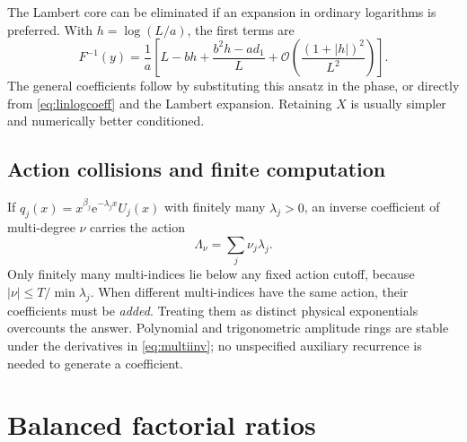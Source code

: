 \documentclass[11pt,a4paper]{article}
\theoremstyle{definition}
\theoremstyle{remark}
\newcommand{\ee}{\mathrm e}
\newcommand{\OO}{\mathcal O}
\numberwithin{equation}{section}
\begin{document}
The Lambert core can be eliminated if an expansion in ordinary logarithms is preferred. With $h=\log(L/a)$, the first terms are
\begin{equation}
 F^{-1}(y)=\frac1a\left[
 L-bh+\frac{b^2h-ad_1}{L}
 +\OO\!\left(\frac{(1+|h|)^2}{L^2}\right)\right].
 \label{eq:flatten}
\end{equation}
The general coefficients follow by substituting this ansatz in the phase, or directly from \eqref{eq:linlogcoeff} and the Lambert expansion. Retaining $X$ is usually simpler and numerically better conditioned.

\subsection{Action collisions and finite computation}
If $q_j(x)=x^{\beta_j}\ee^{-\lambda_jx}U_j(x)$ with finitely many $\lambda_j>0$, an inverse coefficient of multi-degree $\nu$ carries the action
\begin{equation}
 \Lambda_\nu=\sum_j\nu_j\lambda_j.
 \label{eq:action}
\end{equation}
Only finitely many multi-indices lie below any fixed action cutoff, because $|\nu|\le T/\min\lambda_j$. When different multi-indices have the same action, their coefficients must be \emph{added}. Treating them as distinct physical exponentials overcounts the answer. Polynomial and trigonometric amplitude rings are stable under the derivatives in \eqref{eq:multiinv}; no unspecified auxiliary recurrence is needed to generate a coefficient.

\section{Balanced factorial ratios}
\label{sec:ratios}
\end{document}
